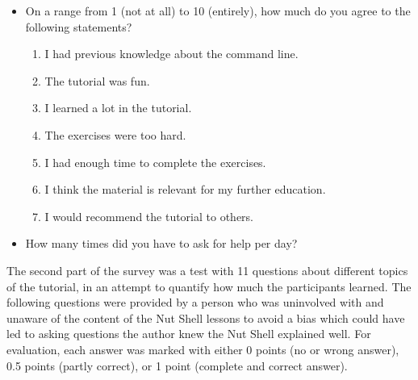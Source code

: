 \documentclass[paper=a4,twoside,abstract=on,cleardoublepage=empty,numbers=noenddot,toc=bib,12pt,appendixprefix=true]{scrreprt}
\begin{document}
\begin{itemize}
    \item On a range from 1 (not at all) to 10 (entirely), how much do you agree to the following statements?
        \begin{enumerate}
            \item I had previous knowledge about the command line.
            \item The tutorial was fun.
            \item I learned a lot in the tutorial.
            \item The exercises were too hard.
            \item I had enough time to complete the exercises.
            \item I think the material is relevant for my further education.
            \item I would recommend the tutorial to others.
        \end{enumerate}
    \item How many times did you have to ask for help per day?
\end{itemize}

The second part of the survey was a test with 11 questions about different topics of the tutorial, in an attempt to quantify how much the participants learned. The following questions were provided by a person who was uninvolved with and unaware of the content of the Nut Shell lessons to avoid a bias which could have led to asking questions the author knew the Nut Shell explained well. For evaluation, each answer was marked with either 0 points (no or wrong answer), 0.5 points (partly correct), or 1 point (complete and correct answer).
\end{document}
